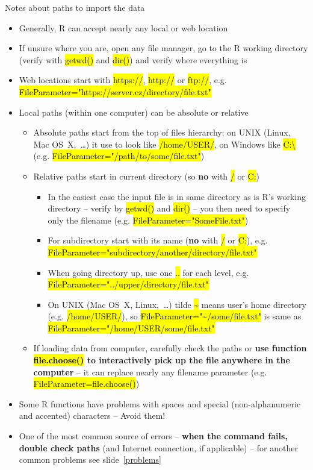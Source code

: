 \documentclass[compress, ucs, xelatex, 11pt, xcolor=svgnames,
  hyperref={
    bookmarks=true,
    unicode=true,
    colorlinks=true,
    pdftitle={Molecular data in R},
    plainpages=false,
    pdfauthor={Vojtech Zeisek},
    pdfsubject={Course about phylogeny and evolution in R},
    pdfcreator={XeLaTeX},
    pdfkeywords={R, evolution, phylogeny, molecular data},
    linkcolor=Tomato,
    anchorcolor=SaddleBrown,
    citecolor=Goldenrod,
    filecolor=DarkMagenta,
    menucolor=Sienna,
    urlcolor=DarkTurquoise,
    pdftex},
  url={hyphens, lowtilde} %
  ]{beamer}
\renewcommand{\texttt}[1]{\hl{\ttfamily #1}}
\begin{document}
\begin{frame}[allowframebreaks]{Notes about paths to import the data}
  \label{path}
  \begin{itemize}
    \item Generally, R can accept nearly any local or web location
    \item If unsure where you are, open any file manager, go to the R working directory (verify with \texttt{getwd()} and \texttt{dir()}) and verify where everything is
    \item Web locations start with \texttt{https://}, \texttt{http://} or \texttt{ftp://}, e.g. \texttt{FileParameter="https://server.cz/directory/file.txt"}
    \item Local paths (within one computer) can be absolute or relative
    \begin{itemize}
      \item Absolute paths start from the top of files hierarchy: on UNIX (Linux, Mac OS~X,~\ldots) it use to look like \texttt{/home/USER/}, on Windows like \texttt{C:\textbackslash} (e.g. \texttt{FileParameter="/path/to/some/file.txt"})
      \item Relative paths start in current directory (so \textbf{no} with \texttt{/} or \texttt{C:})
      \begin{itemize}
	\item In the easiest case the input file is in same directory as is R's working directory -- verify by \texttt{getwd()} and \texttt{dir()} -- you then need to specify only the filename (e.g. \texttt{FileParameter="SomeFile.txt"})
	\item For subdirectory start with its name (\textbf{no} with \texttt{/} or \texttt{C:}), e.g. \texttt{FileParameter="subdirectory/another/directory/file.txt"}
	\item When going directory up, use one \texttt{..} for each level, e.g. \texttt{FileParameter="../upper/directory/file.txt"}
	\item On UNIX (Mac OS~X, Linux,~\ldots) tilde \texttt{\textasciitilde} means user's home directory (e.g. \texttt{/home/USER/}), so \texttt{FileParameter="\textasciitilde/some/file.txt"} is same as \texttt{FileParameter="/home/USER/some/file.txt"}
      \end{itemize}
      \item If loading data from computer, carefully check the paths or \textbf{use function \texttt{file.choose()} to interactively pick up the file anywhere in the computer} -- it can replace nearly any filename parameter (e.g. \alert{\texttt{FileParameter=file.choose()}})
    \end{itemize}
    \item Some R functions have problems with spaces and special (non-alphanumeric and accented) characters -- Avoid them!
    \item One of the most common source of errors -- \textbf{when the command fails, double check paths} (and Internet connection, if applicable) -- for another common problems see slide~\ref{problems}
  \end{itemize}
\end{frame}
\end{document}
